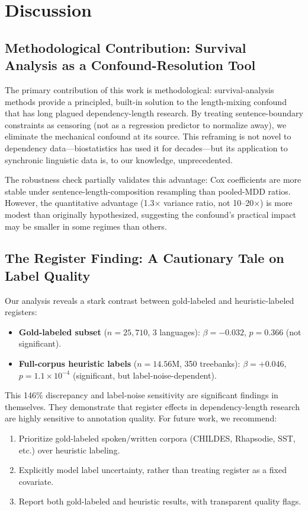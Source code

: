 \documentclass[11pt,letterpaper]{article}
\begin{document}
\section{Discussion}

\subsection{Methodological Contribution: Survival Analysis as a Confound-Resolution Tool}

The primary contribution of this work is methodological: survival-analysis methods provide a principled, built-in solution to the length-mixing confound that has long plagued dependency-length research. By treating sentence-boundary constraints as censoring (not as a regression predictor to normalize away), we eliminate the mechanical confound at its source. This reframing is not novel to dependency data---biostatistics has used it for decades---but its application to synchronic linguistic data is, to our knowledge, unprecedented.

The robustness check partially validates this advantage: Cox coefficients are more stable under sentence-length-composition resampling than pooled-MDD ratios. However, the quantitative advantage (1.3$\times$ variance ratio, not 10--20$\times$) is more modest than originally hypothesized, suggesting the confound's practical impact may be smaller in some regimes than others.

\subsection{The Register Finding: A Cautionary Tale on Label Quality}

Our analysis reveals a stark contrast between gold-labeled and heuristic-labeled registers:
\begin{itemize}
\item \textbf{Gold-labeled subset} ($n=25{,}710$, 3 languages): $\beta=-0.032$, $p=0.366$ (not significant).
\item \textbf{Full-corpus heuristic labels} ($n=14.56$M, 350 treebanks): $\beta=+0.046$, $p=1.1\times10^{-4}$ (significant, but label-noise-dependent).
\end{itemize}

This 146\% discrepancy and label-noise sensitivity are significant findings in themselves. They demonstrate that register effects in dependency-length research are highly sensitive to annotation quality. For future work, we recommend:
\begin{enumerate}
\item Prioritize gold-labeled spoken/written corpora (CHILDES, Rhapsodie, SST, etc.) over heuristic labeling.
\item Explicitly model label uncertainty, rather than treating register as a fixed covariate.
\item Report both gold-labeled and heuristic results, with transparent quality flags.
\end{enumerate}
\end{document}
